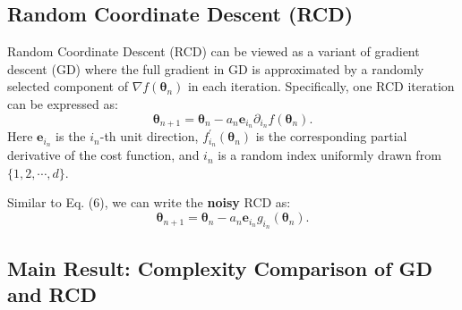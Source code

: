 \documentclass[
        11pt, %
	a4paper, %
]{LegrandOrangeBook}
\begin{document}
\subsection{Random Coordinate Descent (RCD)}

Random Coordinate Descent (RCD) can be viewed as a variant of gradient descent (GD) where the full gradient in GD is approximated by a randomly selected component of $\nabla f\left(\boldsymbol{\theta}_n\right)$ in each iteration. Specifically, one RCD iteration can be expressed as:
\begin{equation}
    \boldsymbol{\theta}_{n+1}=\boldsymbol{\theta}_n-a_n \boldsymbol{e}_{i_n} \partial_{i_n} f\left(\boldsymbol{\theta}_n\right) .
\end{equation}
Here $\boldsymbol{e}_{i_n}$ is the $i_n$-th unit direction, $f_{i_n}^{\prime}\left(\boldsymbol{\theta}_n\right)$ is the corresponding partial derivative of the cost function, and $i_n$ is a random index uniformly drawn from $\{1,2, \cdots, d\}$. 

Similar to Eq. (6), we can write the \textbf{noisy} RCD as:
\begin{equation}
    \boldsymbol{\theta}_{n+1}=\boldsymbol{\theta}_n-a_n \boldsymbol{e}_{i_n} g_{i_n}\left(\boldsymbol{\theta}_n\right).
\end{equation}

\subsection{Main Result: Complexity Comparison of GD and RCD}
\end{document}
